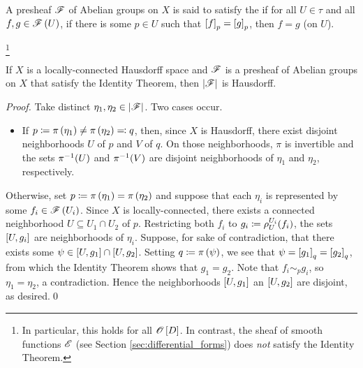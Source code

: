 \documentclass[../Moduli_Spaces_of_Riemann_Surfaces.tex]{subfiles}
\begin{document}
    \begin{definition}
        A presheaf $\mathscr{F}$ of Abelian groups on $X$ is said to satisfy the  if for all $U\in\tau$ and all $f,g\in\mathscr{F}\left(U\right)$, if there is some $p\in U$ such that $\left[f\right]_p=\left[g\right]_p$, then $f=g$ (on $U$).
    \end{definition}
    \footnote{In particular, this holds for all $\mathscr{O}\left[D\right]$. In contrast, the sheaf of smooth functions $\mathscr{E}$ (see Section \ref{sec:differential_forms}) does \textit{not} satisfy the Identity Theorem.}
    \begin{proposition}\label{CS:prp:stalk_topology_Hausdorff}
        If $X$ is a locally-connected Hausdorff space and $\mathscr{F}$ is a presheaf of Abelian groups on $X$ that satisfy the Identity Theorem, then $\left|\mathscr{F}\right|$ is Hausdorff.
    \end{proposition}
    \begin{proof}
        Take distinct $\eta_1,\eta_2\in\left|\mathscr{F}\right|$. Two cases occur.
        \begin{itemize}
            \item If $p\coloneqq\pi\left(\eta_1\right)\neq\pi\left(\eta_2\right)\eqqcolon q$, then, since $X$ is Hausdorff, there exist disjoint neighborhoods $U$ of $p$ and $V$ of $q$. On those neighborhoods, $\pi$ is invertible and the sets $\pi^{-1}\!\left(U\right)$ and $\pi^{-1}\!\left(V\right)$ are disjoint neighborhoods of $\eta_1$ and $\eta_2$, respectively.
        \end{itemize}
        Otherwise, set $p\coloneqq\pi\left(\eta_1\right)=\pi\left(\eta_2\right)$ and suppose that each $\eta_i$ is represented by some $f_i\in\mathscr{F}\left(U_i\right)$. Since $X$ is locally-connected, there exists a connected neighborhood $U\subseteq U_1\cap U_2$ of $p$. Restricting both $f_i$ to $g_i\coloneqq\rho^{U_i}_U\!\left(f_i\right)$, the sets $\left[U,g_i\right]$ are neighborhoods of $\eta_i$. Suppose, for sake of contradiction, that there exists some $\psi\in\left[U,g_1\right]\cap\left[U,g_2\right]$. Setting $q\coloneqq\pi\left(\psi\right)$, we see that $\psi=\left[g_1\right]_q=\left[g_2\right]_q$, from which the Identity Theorem shows that $g_1=g_2$. Note that $f_i\sim_pg_i$, so $\eta_1=\eta_2$, a contradiction. Hence the neighborhoods $\left[U,g_1\right]$ an $\left[U,g_2\right]$ are disjoint, as desired.\qed
    \end{proof}
\end{document}
